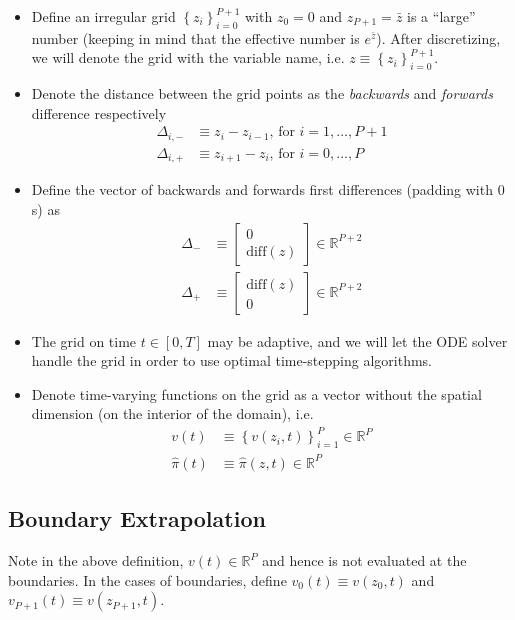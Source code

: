 \documentclass[11pt]{article}
\newcommand{\R}{\ensuremath{\mathbb{R}}}
\newcommand{\set}[1]{\ensuremath{\left\{{#1}\right\}}}
\begin{document}
\begin{itemize}
	\item Define an irregular  grid $\set{z_i}_{i=0}^{P+1}$ with $z_0 = 0$ and $z_{P+1} = \bar{z}$ is a ``large'' number (keeping in mind that the effective number is $e^{\bar{z}}$).  After discretizing, we will denote the grid with the variable name, i.e. $z \equiv \set{z_i}_{i=0}^{P+1}$.
	\item Denote the distance between the grid points as the \textit{backwards} and \textit{forwards} difference respectively
	\begin{align}
	\Delta_{i,-} &\equiv z_i - z_{i-1},\, \text{for } i = 1,\ldots, P+1\\
	\Delta_{i,+} &\equiv z_{i+1} - z_i,\, \text{for } i = 0,\ldots, P
	\end{align}

	\item Define the vector of backwards and forwards first differences (padding with $0$s) as
	\begin{align}
	\Delta_{-} &\equiv \begin{bmatrix} 0 \\
	\text{diff}(z)
	\end{bmatrix}\in\R^{P+2}\label{eq:Delta-minus}\\
	\Delta_{+} &\equiv \begin{bmatrix} \text{diff}(z)\\
	0
\end{bmatrix}\in\R^{P+2}
	\end{align}\label{eq:Delta-plus}
	\item The grid on time $t \in [0,T]$ may be adaptive, and we will let the ODE solver handle the grid in order to use optimal time-stepping algorithms.
	\item Denote time-varying functions on the grid as a vector without the spatial dimension (on the interior of the domain), i.e.
	\begin{align}
	v(t) &\equiv \set{v(z_i, t)}_{i=1}^P\in\R^P\\
	\hat{\pi}(t) &\equiv	\hat{\pi}(z,t) \in \R^P
	\end{align}
\end{itemize}

\subsection{Boundary Extrapolation}
Note in the above definition, $v(t) \in \R^P$ and hence is not evaluated at the boundaries.  In the cases of boundaries, define $v_0(t) \equiv v(z_0, t)$ and $v_{P+1}(t) \equiv v(z_{P+1},t)$.
\end{document}
